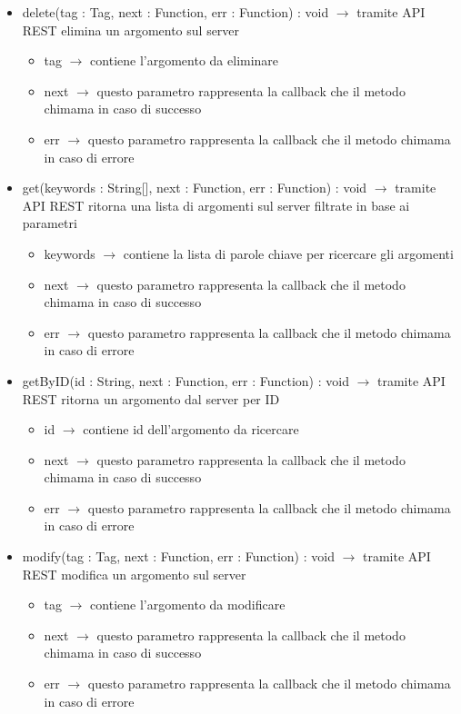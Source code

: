 \begin{description}
\begin{itemize}
	\item delete(tag : Tag, next : Function, err : Function) : void $\rightarrow$ tramite API REST elimina un argomento sul server\begin{itemize}
		\item tag $\rightarrow$ contiene l'argomento da eliminare
		\item next $\rightarrow$ questo parametro rappresenta la callback che il metodo chimama in caso di successo
		\item err $\rightarrow$ questo parametro rappresenta la callback che il metodo chimama in caso di errore
	\end{itemize}
	
	\item get(keywords : String[], next : Function, err : Function) : void $\rightarrow$ tramite API REST ritorna una lista di argomenti sul server filtrate in base ai parametri\begin{itemize}
		\item keywords $\rightarrow$ contiene la lista di parole chiave per ricercare gli argomenti
		\item next $\rightarrow$ questo parametro rappresenta la callback che il metodo chimama in caso di successo
		\item err $\rightarrow$ questo parametro rappresenta la callback che il metodo chimama in caso di errore
	\end{itemize}
	
	\item getByID(id : String, next : Function, err : Function) : void $\rightarrow$ tramite API REST ritorna un argomento dal server per ID\begin{itemize}
		\item id $\rightarrow$ contiene id dell'argomento da ricercare
		\item next $\rightarrow$ questo parametro rappresenta la callback che il metodo chimama in caso di successo
		\item err $\rightarrow$ questo parametro rappresenta la callback che il metodo chimama in caso di errore
	\end{itemize}
	
	\item modify(tag : Tag, next : Function, err : Function) : void $\rightarrow$ tramite API REST modifica un argomento sul server\begin{itemize}
		\item tag $\rightarrow$ contiene l'argomento da modificare
		\item next $\rightarrow$ questo parametro rappresenta la callback che il metodo chimama in caso di successo
		\item err $\rightarrow$ questo parametro rappresenta la callback che il metodo chimama in caso di errore
	\end{itemize}
	

\end{itemize}
\end{description}
